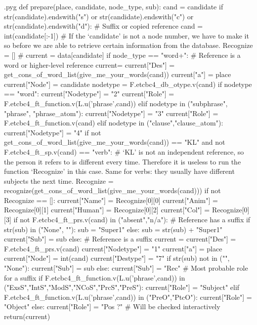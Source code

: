 \documentclass{report}
\makeatletter
\newenvironment{python}{%
  \VerbatimEnvironment
  \minted@resetoptions
  \setkeys{minted@opt}{}
      \begin{VerbatimOut}{\jobname.pyg}}
{%
      \end{VerbatimOut}
      \minted@pygmentize{python}
      \DeleteFile{\jobname.pyg}}
\makeatother
\begin{document}
\begin{python}
def prepare(place, candidate, node_type, sub):
    cand = candidate
    if str(candidate).endswith("s") or str(candidate).endswith("c") or str(candidate).endswith("d"): # Suffix or copied reference
        cand = int(candidate[:-1]) # If the `candidate' is not a node number, we have to make it so before we are able to retrieve certain information from the database.
    Recognize = []
#    current = data[candidate]
    if node_type == "word+": # Reference is a word or higher-level reference
        current= {}
        current["Des"] = get_cons_of_word_list(give_me_your_words(cand))
        current["a"] = place
        current["Node"] = candidate
        nodetype = F.etcbc4_db_otype.v(cand)
        if nodetype == "word":
            current["Nodetype"] = "2"
            current["Role"] = F.etcbc4_ft_function.v(L.u('phrase',cand))
        elif nodetype in ("subphrase", "phrase", "phrase_atom"):
            current["Nodetype"] = "3"
            current["Role"] = F.etcbc4_ft_function.v(cand)
        elif nodetype in ("clause","clause_atom"):
            current["Nodetype"] = "4"
        if not get_cons_of_word_list(give_me_your_words(cand)) == "KL" and not F.etcbc4_ft_sp.v(cand) == "verb": # `KL' is not an independent reference, so the person it refers to is different every time. Therefore it is useless to run the function `Recognize' in this case. Same for verbs: they usually have different subjects the next time.
            Recognize = recognize(get_cons_of_word_list(give_me_your_words(cand)))
        if not Recognize == []:
            current["Name"] = Recognize[0][0]
            current["Anim"] = Recognize[0][1]
            current["Human"] = Recognize[0][2]
            current["Col"] = Recognize[0][3]
        if not F.etcbc4_ft_prs.v(cand) in ("absent","n/a"): # Reference has a suffix
            if str(sub) in ("None", ""):
                sub = "Super1"
            else:
                sub = str(sub) + "Super1"
        current["Sub"] = sub
    else: # Reference is a suffix
        current = {}
        current["Des"] = F.etcbc4_ft_prs.v(cand)
        current["Nodetype"] = "1"
        current["a"] = place
        current["Node"] = int(cand)
        current["Destype"] = "7"
        if str(sub) not in ("", "None"):
            current["Sub"] = sub
        else:
            current["Sub"] = "Rec" # Most probable role for a suffix
        if F.etcbc4_ft_function.v(L.u('phrase',cand)) in ("ExsS","IntS","ModS","NCoS","PrcS","PreS"):
            current["Role"] = "Subject"
        elif F.etcbc4_ft_function.v(L.u('phrase',cand)) in ("PreO","PtcO"):
            current["Role"] = "Object"
        else:
            current["Role"] = "Pos ?" # Will be checked interactively
    return(current)

\end{python}
\end{document}
